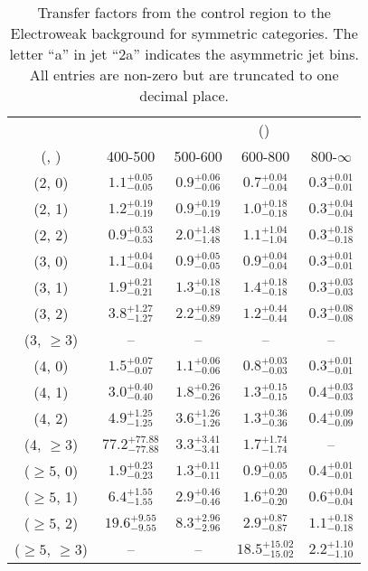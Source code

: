 \begin{table}[h!]
\tiny
\centering
\caption{Transfer factors from the \gj control region to the Electroweak background for symmetric categories. The letter ``a'' in jet \eg ``2a''  indicates the asymmetric jet bins. All entries are non-zero but are truncated to one decimal place.\label{tab:tf_gj_total_sym}}
\begin{tabular}
{ccccc}
	\hline\hline
&	& \multicolumn{4}{c}{\scalht (\gev)} \\ 
	 (\njet,  \nb) & 400-500 & 500-600 & 600-800 & 800-$\infty$ \\ [0.8ex] 
\hline
	(2, 0) & $1.1^{+ 0.05 }_{- 0.05 }$ & $0.9^{+ 0.06 }_{- 0.06 }$ & $0.7^{+ 0.04 }_{- 0.04 }$ & $0.3^{+ 0.01 }_{- 0.01 }$ \\[0.5ex] 
	(2, 1) & $1.2^{+ 0.19 }_{- 0.19 }$ & $0.9^{+ 0.19 }_{- 0.19 }$ & $1.0^{+ 0.18 }_{- 0.18 }$ & $0.3^{+ 0.04 }_{- 0.04 }$ \\[0.5ex] 
	(2, 2) & $0.9^{+ 0.53 }_{- 0.53 }$ & $2.0^{+ 1.48 }_{- 1.48 }$ & $1.1^{+ 1.04 }_{- 1.04 }$ & $0.3^{+ 0.18 }_{- 0.18 }$ \\[0.5ex] 
	(3, 0) & $1.1^{+ 0.04 }_{- 0.04 }$ & $0.9^{+ 0.05 }_{- 0.05 }$ & $0.9^{+ 0.04 }_{- 0.04 }$ & $0.3^{+ 0.01 }_{- 0.01 }$ \\[0.5ex] 
	(3, 1) & $1.9^{+ 0.21 }_{- 0.21 }$ & $1.3^{+ 0.18 }_{- 0.18 }$ & $1.4^{+ 0.18 }_{- 0.18 }$ & $0.3^{+ 0.03 }_{- 0.03 }$ \\[0.5ex] 
	(3, 2) & $3.8^{+ 1.27 }_{- 1.27 }$ & $2.2^{+ 0.89 }_{- 0.89 }$ & $1.2^{+ 0.44 }_{- 0.44 }$ & $0.3^{+ 0.08 }_{- 0.08 }$ \\[0.5ex] 
	(3, $\ge3$) & -- & -- & -- & -- \\[0.5ex] 
	(4, 0) & $1.5^{+ 0.07 }_{- 0.07 }$ & $1.1^{+ 0.06 }_{- 0.06 }$ & $0.8^{+ 0.03 }_{- 0.03 }$ & $0.3^{+ 0.01 }_{- 0.01 }$ \\[0.5ex] 
	(4, 1) & $3.0^{+ 0.40 }_{- 0.40 }$ & $1.8^{+ 0.26 }_{- 0.26 }$ & $1.3^{+ 0.15 }_{- 0.15 }$ & $0.4^{+ 0.03 }_{- 0.03 }$ \\[0.5ex] 
	(4, 2) & $4.9^{+ 1.25 }_{- 1.25 }$ & $3.6^{+ 1.26 }_{- 1.26 }$ & $1.3^{+ 0.36 }_{- 0.36 }$ & $0.4^{+ 0.09 }_{- 0.09 }$ \\[0.5ex] 
	(4, $\ge3$) & $77.2^{+ 77.88 }_{- 77.88 }$ & $3.3^{+ 3.41 }_{- 3.41 }$ & $1.7^{+ 1.74 }_{- 1.74 }$ & -- \\[0.5ex] 
	($\ge5$, 0) & $1.9^{+ 0.23 }_{- 0.23 }$ & $1.3^{+ 0.11 }_{- 0.11 }$ & $0.9^{+ 0.05 }_{- 0.05 }$ & $0.4^{+ 0.01 }_{- 0.01 }$ \\[0.5ex] 
	($\ge5$, 1) & $6.4^{+ 1.55 }_{- 1.55 }$ & $2.9^{+ 0.46 }_{- 0.46 }$ & $1.6^{+ 0.20 }_{- 0.20 }$ & $0.6^{+ 0.04 }_{- 0.04 }$ \\[0.5ex] 
	($\ge5$, 2) & $19.6^{+ 9.55 }_{- 9.55 }$ & $8.3^{+ 2.96 }_{- 2.96 }$ & $2.9^{+ 0.87 }_{- 0.87 }$ & $1.1^{+ 0.18 }_{- 0.18 }$ \\[0.5ex] 
	($\ge5$, $\ge3$) & -- & -- & $18.5^{+ 15.02 }_{- 15.02 }$ & $2.2^{+ 1.10 }_{- 1.10 }$ \\[0.5ex] 
	\hline
	\hline
\end{tabular}
\end{table}
